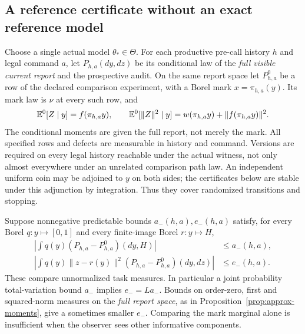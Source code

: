 \subsection*{A reference certificate without an exact reference model}
Choose a single actual model $\theta_*\in\Theta$. For each productive pre-call history $h$ and legal command $a$, let $P_{h,a}(dy,dz)$ be its conditional law of the \emph{full visible current report} and the prospective audit. On the same report space let $P^0_{h,a}$ be a row of the declared comparison experiment, with a Borel mark $x=\pi_{h,a}(y)$. Its mark law is $\nu$ at every such row, and
\begin{equation}\label{eq:row-moments}
 \mathbb E^0[Z\mid y]=f(\pi_{h,a}y),\qquad
 \mathbb E^0[\|Z\|^2\mid y]=w(\pi_{h,a}y)+\|f(\pi_{h,a}y)\|^2.
\end{equation}
The conditional moments are given the full report, not merely the mark. All specified rows and defects are measurable in history and command. Versions are required on every legal history reachable under the actual witness, not only almost everywhere under an unrelated comparison path law. An independent uniform coin may be adjoined to $y$ on both sides; the certificates below are stable under this adjunction by integration. Thus they cover randomized transitions and stopping.

Suppose nonnegative predictable bounds $a_-(h,a),e_-(h,a)$ satisfy, for every Borel $q:y\mapsto[0,1]$ and every finite-image Borel $r:y\mapsto H$,
\begin{align}
 \left|\int q(y)(P_{h,a}-P^0_{h,a})(dy,H)\right|
      &\le a_-(h,a),\label{eq:row-mass}\\
 \left|\int q(y)\|z-r(y)\|^2(P_{h,a}-P^0_{h,a})(dy,dz)\right|
      &\le e_-(h,a).\label{eq:row-loss}
\end{align}
These compare unnormalized task measures. In particular a joint probability total-variation bound $a_-$ implies $e_-=La_-$. Bounds on order-zero, first and squared-norm measures on the \emph{full report space}, as in Proposition~\ref{prop:approx-moments}, give a sometimes smaller $e_-$. Comparing the mark marginal alone is insufficient when the observer sees other informative components.

